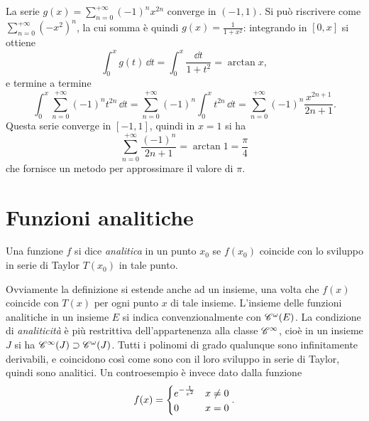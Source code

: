 \begin{esempio} \label{es:serie-potenze-integrale-pi4}
	La serie $g(x)=\sum_{n=0}^{+\infty}(-1)^nx^{2n}$ converge in $(-1,1)$. Si può riscrivere come $\sum_{n=0}^{+\infty}(-x^2)^n$, la cui somma è quindi $g(x)=\frac1{1+x^2}$: integrando in $[0,x]$ si ottiene
	\[
	\int_0^xg(t)\,\dd t=\int_0^x\frac{\dd t}{1+t^2}=\arctan x,
	\]
	e termine a termine
	\[
	\int_0^x\sum_{n=0}^{+\infty}(-1)^nt^{2n}\,\dd t=\sum_{n=0}^{+\infty}(-1)^n\int_0^xt^{2n}\,\dd t=\sum_{n=0}^{+\infty}(-1)^n\frac{x^{2n+1}}{2n+1}.
	\]
	Questa serie converge in $[-1,1]$, quindi in $x=1$ si ha
	\[
	\sum_{n=0}^{+\infty}\frac{(-1)^n}{2n+1}=\arctan 1=\frac{\pi}4
	\]
	che fornisce un metodo per approssimare il valore di $\pi$.
\end{esempio}

\section{Funzioni analitiche}
\begin{definizione}
Una funzione $f$ si dice \emph{analitica} in un punto $x_0$ se $f(x_0)$ coincide con lo sviluppo in serie di Taylor $T(x_0)$ in tale punto.
\end{definizione}
Ovviamente la definizione si estende anche ad un insieme, una volta che $f(x)$ coincide con $T(x)$ per ogni punto $x$ di tale insieme.
L'insieme delle funzioni analitiche in un insieme $E$ si indica convenzionalmente con $\cont[\omega]{E}$. La condizione di \emph{analiticità} è più restrittiva dell'appartenenza alla classe $\cclass[\infty]$, cioè in un insieme $J$ si ha $\cont[\infty]{J}\supset\cont[\omega]{J}$.
Tutti i polinomi di grado qualunque sono infinitamente derivabili, e coincidono così come sono con il loro sviluppo in serie di Taylor, quindi sono analitici. Un controesempio è invece dato dalla funzione
\[
f(x)=\begin{dcases}e^{-\frac1{x^2}}&x\neq 0\\0&x=0\end{dcases}.
\]

